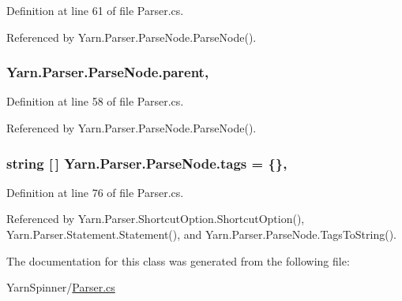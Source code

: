 Definition at line 61 of file Parser.\-cs.



Referenced by Yarn.\-Parser.\-Parse\-Node.\-Parse\-Node().

\hypertarget{a00142_af313a82103fcc2ff5a177dbb06b92f7b}{
\subsubsection[{parent}]{ Yarn.\-Parser.\-Parse\-Node.\-parent\hspace{0.3cm}{\ttfamily [package]}, {\ttfamily [inherited]}}}\label{a00142_af313a82103fcc2ff5a177dbb06b92f7b}


Definition at line 58 of file Parser.\-cs.



Referenced by Yarn.\-Parser.\-Parse\-Node.\-Parse\-Node().

\hypertarget{a00142_a58b3a15788fd2d4127d73619dc6d04ae}{
\subsubsection[{tags}]{\setlength{\rightskip}{0pt plus 5cm}string \mbox{[}$\,$\mbox{]} Yarn.\-Parser.\-Parse\-Node.\-tags = \{\}\hspace{0.3cm}{\ttfamily [package]}, {\ttfamily [inherited]}}}\label{a00142_a58b3a15788fd2d4127d73619dc6d04ae}


Definition at line 76 of file Parser.\-cs.



Referenced by Yarn.\-Parser.\-Shortcut\-Option.\-Shortcut\-Option(), Yarn.\-Parser.\-Statement.\-Statement(), and Yarn.\-Parser.\-Parse\-Node.\-Tags\-To\-String().



The documentation for this class was generated from the following file\-:\begin{DoxyCompactItemize}
\item 
Yarn\-Spinner/\hyperlink{a00301}{Parser.\-cs}\end{DoxyCompactItemize}
